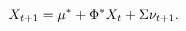\begin{equation} \label{eq:XvarsQ}
	X_{t+1} = \mu^{*} + \Phi^{*} X_{t}  + \Sigma \nu_{t+1}.
\end{equation}